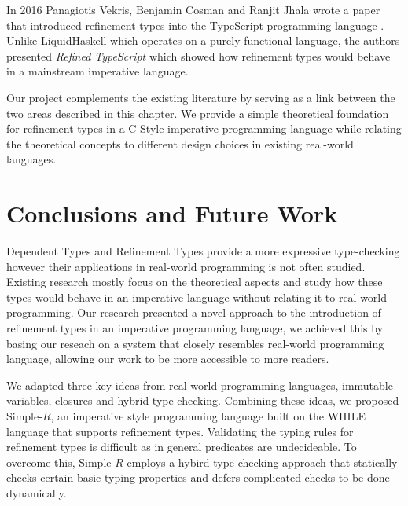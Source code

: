 \documentclass[a4paper,12pt]{report}
\begin{document}
\par
In 2016 Panagiotis Vekris, Benjamin Cosman and Ranjit Jhala wrote a paper that introduced refinement types into the TypeScript 
programming language \cite{rts}. Unlike LiquidHaskell which operates 
on a purely functional language, the authors presented \textit{Refined TypeScript} 
which showed how refinement types would behave in a mainstream imperative language. 

\par
Our project complements the existing literature by serving as a link between 
the two areas described in this chapter. We provide a simple theoretical 
foundation for refinement types in a C-Style imperative programming language 
while relating the theoretical concepts to different design choices in existing 
real-world languages. 

\chapter{Conclusions and Future Work} \label{chapter:further_work}
Dependent Types and Refinement Types provide a more expressive type-checking 
however their applications in real-world programming is not often studied. 
Existing research mostly focus on the theoretical aspects and study how 
these types would behave in an imperative language without relating it to 
real-world programming. Our research presented a novel approach to the 
introduction of refinement types in an imperative programming language, we 
achieved this by basing our reseach on a system that closely resembles 
real-world programming language, allowing our work to be more accessible 
to more readers. 

\par
We adapted three key ideas from real-world programming languages, 
immutable variables, closures and hybrid type checking. Combining these 
ideas, we proposed Simple-$R$, an imperative style programming language 
built on the WHILE language that supports refinement types. Validating the 
typing rules for refinement types is difficult as in general predicates are 
undecideable. To overcome this, Simple-$R$ employs a hybird 
type checking approach that statically checks certain basic typing 
properties and defers complicated checks to be done dynamically. 
\end{document}
